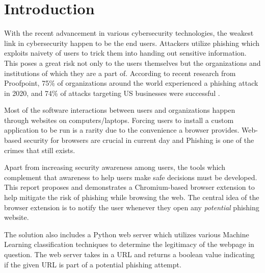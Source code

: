 \documentclass[conference]{IEEEtran}
\begin{document}

\section{Introduction}

With the recent advancement in various cybersecurity technologies, the weakest link in  cybersecurity happen to be the end users.
Attackers utilize phishing which exploits naivety of users to trick them into handing out sensitive information.
This poses a great risk not only to the users themselves but the organizations and institutions of which they are a part of.
According to recent research from Proofpoint, 75\% of organizations around the world experienced a phishing attack in 2020, and 74\% of attacks targeting US businesses were successful \cite{stateofphishing}.

\par Most of the software interactions between users and organizations happen through websites on computers/laptops. Forcing users to install a custom application to be run is a rarity due to the convenience a browser provides. Web-based security for browsers are crucial in current day and Phishing is one of the crimes that still exists.

\par Apart from increasing security awareness among users, the tools which complement that awareness to help users make safe decisions must be developed.
This report proposes and demonstrates a Chromium-based browser extension to help mitigate the risk of phishing while browsing the web.
The central idea of the browser extension is to notify the user whenever they open any \emph{potential} phishing website.

\par The solution also includes a Python web server which utilizes various Machine Learning classification techniques to determine the legitimacy of the webpage in question.
The web server takes in a URL and returns a boolean value indicating if the given URL is part of a potential phishing attempt.
\end{document}
